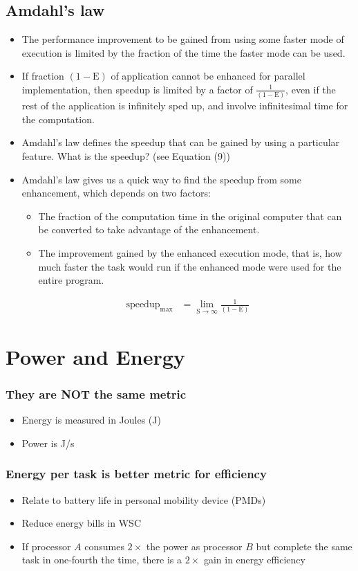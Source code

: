 \documentclass[11pt]{article}
\begin{document}
\subsection{Amdahl's law}
\begin{itemize}
    \item The performance improvement to be gained from using some faster mode of execution is limited by the fraction of the time the faster mode can be used.
    \item If fraction \((1 - \text{E})\) of application cannot be enhanced for parallel implementation, then speedup is limited by a factor of \(\frac{1}{(1 - \text{E})}\), even if the rest of the application is infinitely sped up, and involve infinitesimal time for the computation.
    \item Amdahl's law defines the speedup that can be gained by
    using a particular feature. What is the speedup? (see Equation (9))
    \item Amdahl's law gives us a quick way to find the speedup from some
    enhancement, which depends on two factors:
    \begin{itemize}
        \item The fraction of the computation time in the original computer that can be converted to take advantage of the enhancement.
        \item The improvement gained by the enhanced execution mode, that is, how much faster the task would run if the enhanced mode were used for the entire program.
    \end{itemize}
    \begin{align}
        \text{speedup}_{\text{max}} &= \lim_{\text{S} \to \infty} \frac{1}{(1 - \text{E})}
    \end{align}
\end{itemize}

\section{Power and Energy}
\subsubsection{They are NOT the same metric}
\begin{itemize}
    \item Energy is measured in Joules (J)
    \item Power is J/s
\end{itemize}
\subsubsection{Energy per task is better metric for efficiency}
\begin{itemize}
    \item Relate to battery life in personal mobility device (PMDs)
    \item Reduce energy bills in WSC
    \item If processor \(A\) consumes \(2\times\) the power as processor \(B\) but complete the same task in one-fourth the time, there is a \(2\times\) gain in energy efficiency
\end{itemize}
\end{document}
